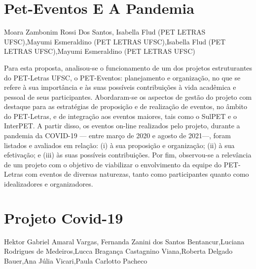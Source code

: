 \section*{Pet-Eventos E A Pandemia}

Moara Zambonim Rossi Dos Santos, Isabella Flud (PET LETRAS UFSC),Mayumi Esmeraldino (PET LETRAS UFSC),Isabella Flud (PET LETRAS UFSC),Mayumi Esmeraldino (PET LETRAS UFSC)

Para esta proposta, analisou-se o funcionamento de um dos projetos estruturantes do PET-Letras UFSC, o PET-Eventos: planejamento e organização, no que se refere à sua importância e às suas possíveis contribuições à vida acadêmica e pessoal de seus participantes. Abordaram-se os aspectos de gestão do projeto com destaque para as estratégias de proposição e de realização de eventos, no âmbito do PET-Letras, e de integração aos eventos maiores, tais como o SulPET e o InterPET. A partir disso, os eventos on-line realizados pelo projeto, durante a pandemia da COVID-19 — entre março de 2020 e agosto de 2021—, foram listados e avaliados em relação: (i) à sua proposição e organização; (ii) à sua efetivação; e (iii) às suas possíveis contribuições. Por fim, observou-se a relevância de um projeto com o objetivo de viabilizar o envolvimento da equipe do PET-Letras com eventos de diversas naturezas, tanto como participantes quanto como idealizadores e organizadores.




\section*{Projeto Covid-19}

Hektor Gabriel Amaral Vargas, Fernanda Zanini dos Santos Bentancur,Luciana Rodrigues de Medeiros,Lucca Bragança Castagnino Viana,Roberta Delgado Bauer,Ana Júlia Vicari,Paula Carlotto Pacheco

